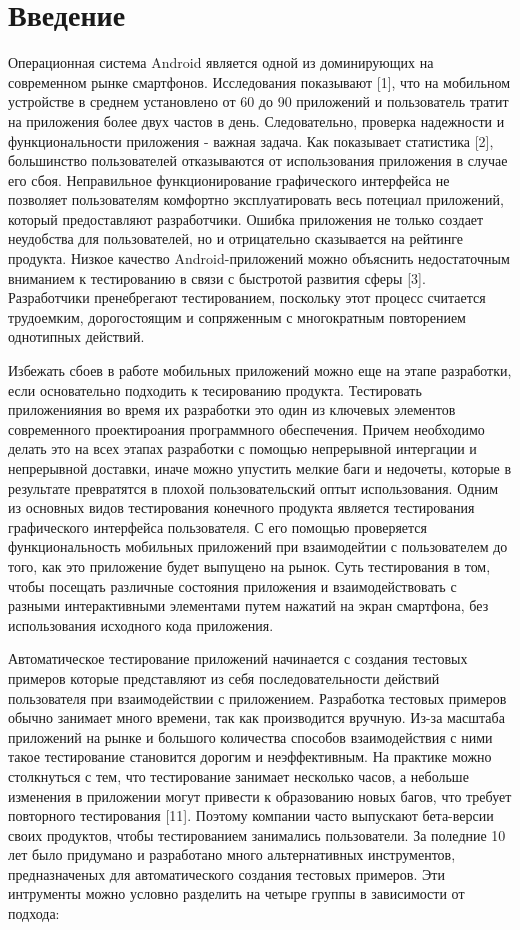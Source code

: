 \section*{Введение}
\label{sec:Chapter0} 

Операционная система Android является одной из доминирующих на современном рынке смартфонов. Исследования показывают [1], что на мобильном устройстве в среднем установлено от 60 до 90 приложений и пользователь тратит на приложения более двух частов в день. Следовательно, проверка надежности и функциональности приложения - важная задача. Как показывает статистика [2], большинство пользователей отказываются от использования приложения в случае его сбоя. Неправильное функционирование графического интерфейса не позволяет пользователям комфортно эксплуатировать весь потециал приложений, который предоставляют разработчики. Ошибка приложения не только создает неудобства для пользователей, но и отрицательно сказывается на рейтинге продукта. Низкое качество Android-приложений можно объяснить недостаточным вниманием к тестированию в связи с быстротой развития сферы [3]. Разработчики пренебрегают тестированием, поскольку этот процесс считается трудоемким, дорогостоящим и сопряженным с многократным повторением однотипных действий.

Избежать сбоев в работе мобильных приложений можно еще на этапе разработки, если основательно подходить к тесированию продукта. Тестировать приложенияния во время их разработки это один из ключевых элементов современного проектироания программного обеспечения. Причем необходимо делать это на всех этапах разработки с помощью непрерывной интергации и непрерывной доставки, иначе можно упустить мелкие баги и недочеты, которые в результате превратятся в плохой пользовательский оптыт использования. Одним из основных видов тестирования конечного продукта является тестирования графического интерфейса пользователя. С его помощью проверяется функциональность мобильных приложений при взаимодейтии с пользователем до того, как это приложение будет выпущено на рынок. Суть тестирования в том, чтобы посещать различные состояния приложения и взаимодействовать с разными интерактивными элементами путем нажатий на экран смартфона, без использования исходного кода приложения.

Автоматическое тестирование приложений начинается с создания тестовых примеров которые представляют из себя последовательности действий пользователя при взаимодействии с приложением. Разработка тестовых примеров обычно занимает много времени, так как производится вручную. Из-за масштаба приложений на рынке и большого количества способов взаимодействия с ними такое тестирование становится дорогим и неэффективным. На практике можно столкнуться с тем, что тестирование занимает несколько часов, а небольше изменения в приложении могут привести к образованию новых багов, что требует повторного тестирования [11]. Поэтому компании часто выпускают бета-версии своих продуктов, чтобы тестированием занимались пользователи. 
За поледние 10 лет было придумано и разработано много альтернативных инструментов, предназначеных для автоматического создания тестовых примеров. Эти интрументы можно условно разделить на четыре группы в зависимости от подхода:

